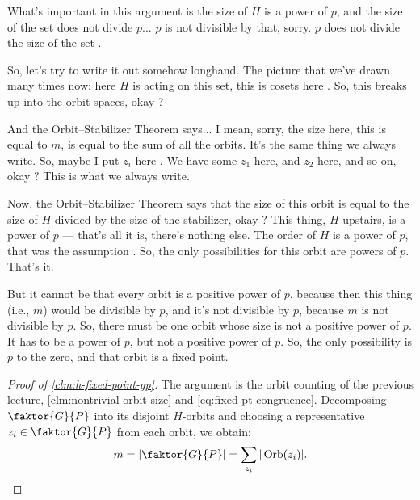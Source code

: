 \begin{proofWrapper}
\begin{speech}[00:25:14 - 00:27:23]
What's important in this argument is the size of $H$ is a power of $p$, and the size of the set does not divide $p$... $p$ is not divisible by that, sorry. $p$ does not divide the size of the set .

So, let's try to write it out somehow longhand. The picture that we've drawn many times now: here $H$ is acting on this set, this is cosets here . So, this breaks up into the orbit spaces, okay ?

And the Orbit--Stabilizer Theorem says... I mean, sorry, the size here, this is equal to $m$, is equal to the sum of all the orbits. It's the same thing we always write. So, maybe I put $z_i$ here . We have some $z_1$ here, and $z_2$ here, and so on, okay ? This is what we always write.

Now, the Orbit--Stabilizer Theorem says that the size of this orbit is equal to the size of $H$ divided by the size of the stabilizer, okay ? This thing, $H$ upstairs, is a power of $p$ --- that's all it is, there's nothing else. The order of $H$ is a power of $p$, that was the assumption . So, the only possibilities for this orbit are powers of $p$. That's it.

But it cannot be that every orbit is a positive power of $p$, because then this thing (i.e., $m$) would be divisible by $p$, and it's not divisible by $p$, because $m$ is not divisible by $p$. So, there must be one orbit whose size is not a positive power of $p$. It has to be a power of $p$, but not a positive power of $p$. So, the only possibility is $p$ to the zero, and that orbit is a fixed point.
\end{speech}

\begin{content}
\begin{proof}[Proof of \cref{clm:h-fixed-point-gp}]
The argument is the orbit counting of the previous lecture, \cref{clm:nontrivial-orbit-size} and \eqref{eq:fixed-pt-congruence}. Decomposing $\faktor{G}{P}$ into its disjoint $H$-orbits and choosing a representative $z_i \in \faktor{G}{P}$ from each orbit, we obtain:
\begin{equation}\label{eq:p2-gp-orbit-sum}
m = \left|\faktor{G}{P}\right| = \sum_{z_i} |\operatorname{Orb}(z_i)|.
\end{equation}


\end{proof}
\end{content}
\end{proofWrapper}
